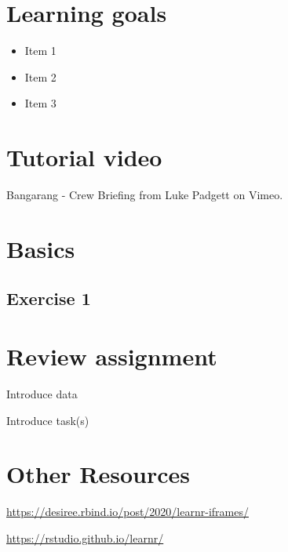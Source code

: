 \documentclass[
]{book}
\providecommand{\tightlist}{%
  \setlength{\itemsep}{0pt}\setlength{\parskip}{0pt}}
\begin{document}
\hypertarget{learning-goals-7}{%
\section*{Learning goals}\label{learning-goals-7}}

\begin{itemize}
\tightlist
\item
  Item 1\\
\item
  Item 2\\
\item
  Item 3
\end{itemize}

\hypertarget{tutorial-video-2}{%
\section*{Tutorial video}\label{tutorial-video-2}}

Bangarang - Crew Briefing from Luke Padgett on Vimeo.

\hypertarget{basics-1}{%
\section*{Basics}\label{basics-1}}

\hypertarget{exercise-1-6}{%
\subsection*{Exercise 1}\label{exercise-1-6}}

\hypertarget{review-assignment-7}{%
\section*{Review assignment}\label{review-assignment-7}}

Introduce data

Introduce task(s)

\hypertarget{other-resources-6}{%
\section*{Other Resources}\label{other-resources-6}}

\url{https://desiree.rbind.io/post/2020/learnr-iframes/}

\url{https://rstudio.github.io/learnr/}

  
\end{document}
